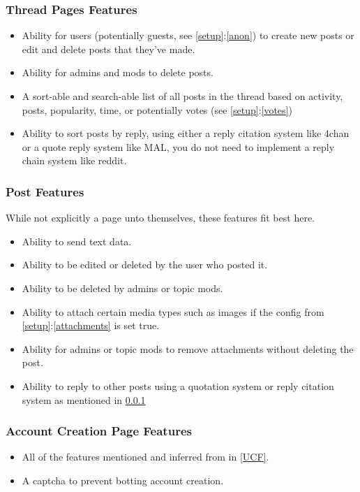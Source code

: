 \documentclass[]{article}
\begin{document}
\subsubsection{Thread Pages Features}\label{threadF}
\begin{itemize}
    \item Ability for users (potentially guests, see \ref{setup}:\ref{anon}) to create new posts or edit and delete posts that they've made.
    \item Ability for admins and mods to delete posts.
    \item A sort-able and search-able list of all posts in the thread based on activity, posts, popularity, time, or potentially votes (see \ref{setup}:\ref{votes}) 
    \item Ability to sort posts by reply, using either a reply citation system like 4chan or a quote reply system like MAL, you do not need to implement a reply chain system like reddit.
\end{itemize}

\subsubsection{Post Features}
While not explicitly a page unto themselves, these features fit best here. 
\begin{itemize}
    \item Ability to send text data.
    \item Ability to be edited or deleted by the user who posted it.
    \item Ability to be deleted by admins or topic mods.
    \item Ability to attach certain media types such as images if the config from \ref{setup}:\ref{attachments} is set true.
    \item Ability for admins or topic mods to remove attachments without deleting the post. 
    \item Ability to reply to other posts using a quotation system or reply citation system as mentioned in \ref{threadF}
\end{itemize}

\subsubsection{Account Creation Page Features}
\begin{itemize}
    \item All of the features mentioned and inferred from in \ref{UCF}.
    \item A captcha to prevent botting account creation.
\end{itemize}
\end{document}
